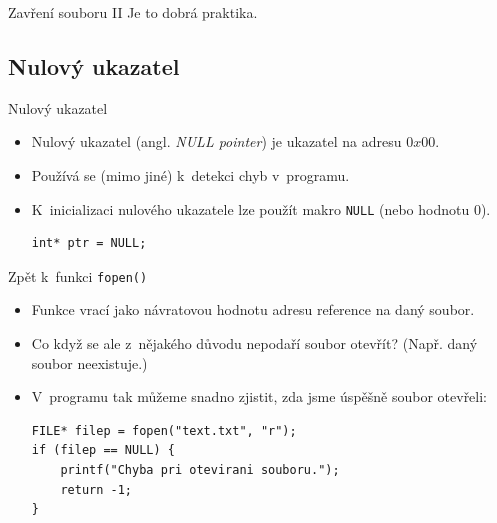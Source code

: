 \documentclass[14pt,aspectratio=169]{beamer}
\begin{document}
    \begin{frame}{Zavření souboru \textrm{II}}
         Je to dobrá praktika. 
    \end{frame}

    \subsection{Nulový ukazatel}
    \begin{frame}[t,fragile]{Nulový ukazatel}
        \begin{itemize}
            \item Nulový ukazatel (angl. \emph{NULL pointer}) je ukazatel na adresu $0x00$.
            \item Používá se (mimo jiné) k~detekci chyb v~programu.
            \item K~inicializaci nulového ukazatele lze použít makro \texttt{NULL} (nebo hodnotu $0$).
            \begin{lstlisting}
int* ptr = NULL;
            \end{lstlisting}
        \end{itemize}
    \end{frame}

    \begin{frame}[t,fragile]{Zpět k~funkci \texttt{fopen()}}
        \begin{itemize}
            \item Funkce vrací jako návratovou hodnotu adresu reference na daný soubor.
            \item Co když se ale z~nějakého důvodu nepodaří soubor otevřít? (Např. daný soubor neexistuje.)
            \begin{center}
            \end{center}
            \item V~programu tak můžeme snadno zjistit, zda jsme úspěšně soubor otevřeli:
            \begin{lstlisting}
FILE* filep = fopen("text.txt", "r");
if (filep == NULL) {
    printf("Chyba pri otevirani souboru.");
    return -1;
}
            \end{lstlisting}
        \end{itemize}
    \end{frame}
\end{document}
